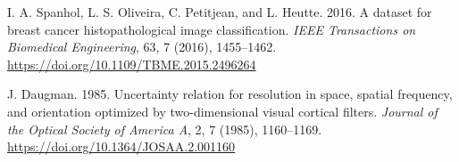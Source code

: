 \documentclass[12pt]{article}
\begin{document}
\begin{thebibliography}{99}
    I. A. Spanhol, L. S. Oliveira, C. Petitjean, and L. Heutte. 2016. A dataset for breast cancer histopathological image classification. \textit{IEEE Transactions on Biomedical Engineering}, 63, 7 (2016), 1455–1462. \url{https://doi.org/10.1109/TBME.2015.2496264}

    J. Daugman. 1985. Uncertainty relation for resolution in space, spatial frequency, and orientation optimized by two-dimensional visual cortical filters. \textit{Journal of the Optical Society of America A}, 2, 7 (1985), 1160–1169. \url{https://doi.org/10.1364/JOSAA.2.001160}
    
    \end{thebibliography}
    
\end{document}
